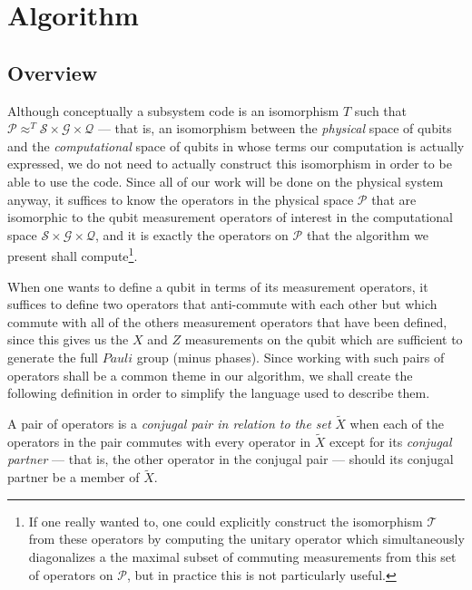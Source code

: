 \documentclass[twocolumn,showpacs,preprintnumbers,amsmath,amssymb,nofootinbib,pra,floatfix]{revtex4}
\newenvironment{definition}[1][Definition]{\begin{trivlist}
\item[\hskip \labelsep {\bfseries #1}]}{\end{trivlist}}
\begin{document}
\section{Algorithm}

\subsection{Overview}

\label{overview}

Although conceptually a subsystem code is an isomorphism $T$ such that  $\mathscr{P}\approx^T \mathscr{S}\times\mathscr{G}\times\mathscr{Q}$ --- that is, an isomorphism between the \emph{physical} space of qubits and the \emph{computational} space of qubits in whose terms our computation is actually expressed, we do not need to actually construct this isomorphism in order to be able to use the code.  Since all of our work will be done on the physical system anyway, it suffices to know the operators in the physical space $\mathscr{P}$ that are isomorphic to the qubit measurement operators of interest in the computational space $\mathscr{S}\times\mathscr{G}\times\mathscr{Q}$, and it is exactly the operators on $\mathscr{P}$ that the algorithm we present shall compute\footnote{If one really wanted to, one could explicitly construct the isomorphism $\mathscr{T}$ from these operators by computing the unitary operator which simultaneously diagonalizes a the maximal subset of commuting measurements from this set of operators on $\mathscr{P}$, but in practice this is not particularly useful.}.

When one wants to define a qubit in terms of its measurement operators, it suffices to define two operators that anti-commute with each other but which commute with all of the others measurement operators that have been defined, since this gives us the $X$ and $Z$ measurements on the qubit which are sufficient to generate the full $Pauli$ group (minus phases).  Since working with such pairs of operators shall be a common theme in our algorithm, we shall create the following definition in order to simplify the language used to describe them.

\begin{definition} A pair of operators is a \emph{conjugal pair in relation to the set} $\tilde X$ when each of the operators in the pair commutes with every operator in $\tilde X$ except for its \emph{conjugal partner} --- that is, the other operator in the conjugal pair --- should its conjugal partner be a member of $\tilde X$.
\end{definition}
\end{document}
